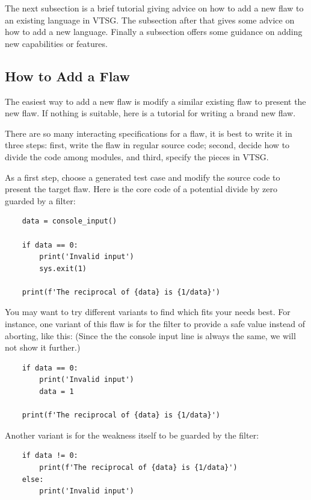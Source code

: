 \documentclass[12pt]{article}
\begin{document}
The next subsection is a brief tutorial giving advice on how to add a new flaw to an
existing language in VTSG.  The subsection after that gives some advice on how to add
a new language.  Finally a subsection offers some guidance on adding new capabilities
or features.

\subsection{How to Add a Flaw}

The easiest way to add a new flaw is modify a similar existing flaw to present the
new flaw.  If nothing is suitable, here is a tutorial for writing a brand new flaw.

There are so many interacting specifications for a flaw, it is best to write it in
three steps: first, write the flaw in regular source code; second, decide how to
divide the code among modules, and third, specify the pieces in VTSG.

As a first step, choose a generated test case and modify the source code to present
the target flaw.  Here is the core code of
a potential divide by zero guarded by a filter:
\begin{verbatim}
    data = console_input()

    if data == 0:
        print('Invalid input')
        sys.exit(1)

    print(f'The reciprocal of {data} is {1/data}')
\end{verbatim}
You may want to try different variants to find which fits your needs best.  For
instance, one variant of this flaw is for the filter to provide a safe value instead
of aborting, like this:
(Since the the console input line is always the same, we will not show it
further.)
\begin{verbatim}
    if data == 0:
        print('Invalid input')
        data = 1

    print(f'The reciprocal of {data} is {1/data}')
\end{verbatim}
Another variant is for the weakness itself to be guarded by the filter:
\begin{verbatim}
    if data != 0:
        print(f'The reciprocal of {data} is {1/data}')
    else:
        print('Invalid input')
\end{verbatim}
\end{document}

